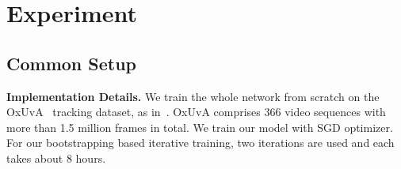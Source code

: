 \documentclass[10pt,twocolumn,letterpaper]{article}
\begin{document}
\vspace{-3pt}
\section{Experiment}
\label{sec:exp}
\vspace{-2pt}
\subsection{Common Setup}
\vspace{-1pt}
\noindent\textbf{Implementation Details.}  We train the whole network from scratch on the OxUvA~\!\cite{valmadre2018long} tracking dataset, as in~\!\cite{Lai19}. OxUvA comprises 366 video sequences with more than 1.5 million frames in total. We train our model with  SGD optimizer. For our bootstrapping based iterative training, two iterations are used and each takes about 8 hours.
\end{document}
